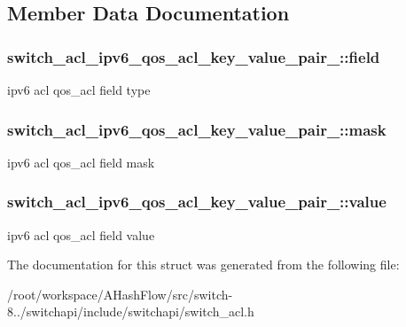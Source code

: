 \subsection{Member Data Documentation}
\hypertarget{structswitch__acl__ipv6__qos__acl__key__value__pair___aa675494d1dcd3c6e98cfefc49f717122}{
\subsubsection[{field}]{ switch\+\_\+acl\+\_\+ipv6\+\_\+qos\+\_\+acl\+\_\+key\+\_\+value\+\_\+pair\+\_\+\+::field}}\label{structswitch__acl__ipv6__qos__acl__key__value__pair___aa675494d1dcd3c6e98cfefc49f717122}
ipv6 acl qos\+\_\+acl field type \hypertarget{structswitch__acl__ipv6__qos__acl__key__value__pair___a0576d1755fd5f9d6410ad5fe6c5e7682}{
\subsubsection[{mask}]{ switch\+\_\+acl\+\_\+ipv6\+\_\+qos\+\_\+acl\+\_\+key\+\_\+value\+\_\+pair\+\_\+\+::mask}}\label{structswitch__acl__ipv6__qos__acl__key__value__pair___a0576d1755fd5f9d6410ad5fe6c5e7682}
ipv6 acl qos\+\_\+acl field mask \hypertarget{structswitch__acl__ipv6__qos__acl__key__value__pair___a112aa6a99d10b17497c9e2ff293ac8ca}{
\subsubsection[{value}]{ switch\+\_\+acl\+\_\+ipv6\+\_\+qos\+\_\+acl\+\_\+key\+\_\+value\+\_\+pair\+\_\+\+::value}}\label{structswitch__acl__ipv6__qos__acl__key__value__pair___a112aa6a99d10b17497c9e2ff293ac8ca}
ipv6 acl qos\+\_\+acl field value 

The documentation for this struct was generated from the following file\+:\begin{DoxyCompactItemize}
\item 
/root/workspace/\+A\+Hash\+Flow/src/switch-\/8../switchapi/include/switchapi/switch\+\_\+acl.\+h\end{DoxyCompactItemize}
